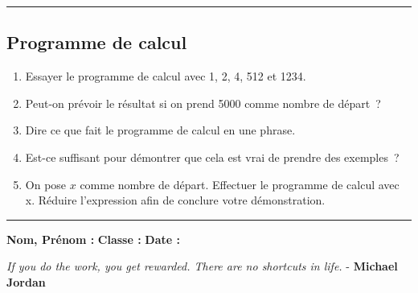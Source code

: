 \documentclass[11pt]{article}
\newcommand{\horrule}[1]{\rule{\linewidth}{#1}} %
\begin{document}
\vspace{-0.4cm}
\horrule{1px}
\vspace{-0.8cm}

\subsection*{Programme de calcul}

\begin{enumerate}
  \item Essayer le programme de calcul avec 1, 2, 4, 512 et 1234.
  \item Peut-on prévoir le résultat si on prend 5000 comme nombre de départ ?
  \item Dire ce que fait le programme de calcul en une phrase.
  \item Est-ce suffisant pour démontrer que cela est vrai de prendre des exemples ?
  \item On pose $x$ comme nombre de départ. Effectuer le programme de calcul avec x. Réduire l’expression afin de conclure votre démonstration.
\end{enumerate}

\vspace{1cm}
\horrule{1px}
\vspace{1cm}

\textbf{Nom, Prénom :} \hspace{8cm} \textbf{Classe :} \hspace{3cm} \textbf{Date :}\\
\vspace{-0.8cm}
\begin{center}
  \textit{If you do the work, you get rewarded. There are no shortcuts in life.}  - \textbf{Michael Jordan}
\end{center}
\vspace{-0.8cm}
\end{document}
